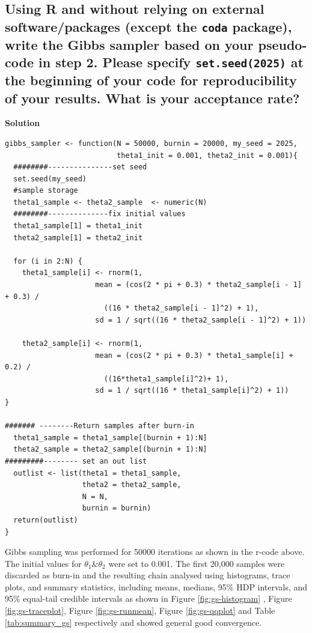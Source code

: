 \documentclass[12pt]{article}
\begin{document}
\subsection{Using R and without relying on external software/packages (except the \texttt{coda} package), write the Gibbs sampler based on your pseudo-code in step 2. Please specify \texttt{set.seed(2025)} at the beginning of your code for reproducibility of your results. What is your acceptance rate?}

\textbf{Solution}

\begin{lstlisting}
gibbs_sampler <- function(N = 50000, burnin = 20000, my_seed = 2025,
                          theta1_init = 0.001, theta2_init = 0.001){
  ########---------------set seed
  set.seed(my_seed)
  #sample storage
  theta1_sample <- theta2_sample  <- numeric(N)
  ########--------------fix initial values
  theta1_sample[1] = theta1_init
  theta2_sample[1] = theta2_init
  
  for (i in 2:N) {
    theta1_sample[i] <- rnorm(1,
                     mean = (cos(2 * pi + 0.3) * theta2_sample[i - 1] + 0.3) /
                       ((16 * theta2_sample[i - 1]^2) + 1),
                     sd = 1 / sqrt((16 * theta2_sample[i - 1]^2) + 1))
  
    theta2_sample[i] <- rnorm(1,
                     mean = (cos(2 * pi + 0.3) * theta1_sample[i] + 0.2) /
                       ((16*theta1_sample[i]^2)+ 1),
                     sd = 1 / sqrt((16 * theta1_sample[i]^2) + 1))
}

####### --------Return samples after burn-in
  theta1_sample = theta1_sample[(burnin + 1):N]
  theta2_sample = theta2_sample[(burnin + 1):N]
#########-------- set an out list
  outlist <- list(theta1 = theta1_sample,
                  theta2 = theta2_sample,
                  N = N,
                  burnin = burnin)
  return(outlist)
}

\end{lstlisting}

Gibbs sampling was performed for 50000 iterations  as shown  in the r-code above. The initial values for $\theta_1 \& \theta_2$ were set to 0.001. The first 20,000 samples were discarded as burn-in and the resulting chain analysed using histograms, trace plots, and summary statistics, including means, medians, 95\% HDP intervals, and 95\% equal-tail credible intervals as shown in Figure \ref{fig:gs-histogram} , Figure \ref{fig:gs-traceplot}, Figure \ref{fig:gs-runmean}, Figure \ref{fig:gs-qqplot} and Table \ref{tab:summary_gs} respectively and showed general good convergence.
\end{document}
